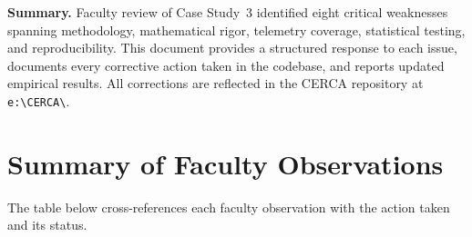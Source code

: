 \documentclass[11pt,a4paper]{article}
\begin{document}
\vspace{10pt}
\textbf{Summary.}
Faculty review of Case Study~3 identified eight critical weaknesses spanning methodology, mathematical rigor, telemetry coverage, statistical testing, and reproducibility. This document provides a structured response to each issue, documents every corrective action taken in the codebase, and reports updated empirical results. All corrections are reflected in the CERCA repository at \texttt{e:\textbackslash CERCA\textbackslash}.

\newpage

\section{Summary of Faculty Observations}

The table below cross-references each faculty observation with the action taken and its status.
\end{document}
